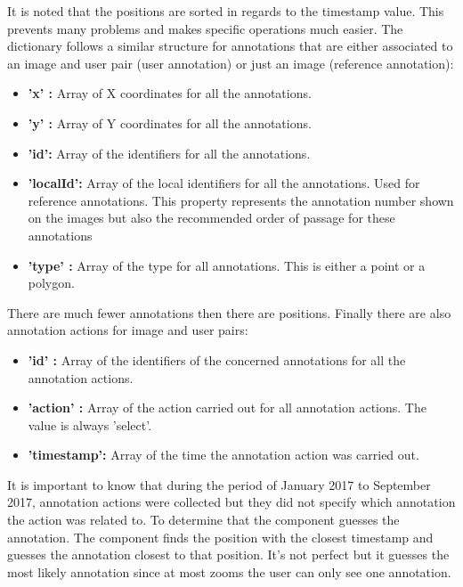 \documentclass[a4paper,11pt]{report}
\numberwithin{figure}{section} %
\begin{document}
    It is noted that the positions are sorted in regards to the timestamp value.
    This prevents many problems and makes specific operations much easier.
    The dictionary follows a similar structure for annotations that are either associated to an image and user pair (user annotation) or just an image (reference annotation):
    \begin{itemize}
        \item[\textbullet] \textbf{'x' :} Array of X coordinates for all the annotations.
        \item[\textbullet] \textbf{'y' :} Array of Y coordinates for all the annotations.
        \item[\textbullet] \textbf{'id':} Array of the identifiers for all the annotations.
        \item[\textbullet] \textbf{'localId':} Array of the local identifiers for all the annotations.
        Used for reference annotations.
        This property represents the annotation number shown on the images but also the recommended order of passage for these annotations
        \item[\textbullet] \textbf{'type' :} Array of the type for all annotations.
        This is either a point or a polygon.
    \end{itemize}

    There are much fewer annotations then there are positions.
    Finally there are also annotation actions for image and user pairs:
    \begin{itemize}
        \item[\textbullet] \textbf{'id' :} Array of the identifiers of the concerned annotations for all the annotation actions.
        \item[\textbullet] \textbf{'action' :} Array of the action carried out for all annotation actions.
        The value is always 'select'.
        \item[\textbullet] \textbf{'timestamp':} Array of the time the annotation action was carried out.
    \end{itemize}
    It is important to know that during the period of January 2017 to September 2017, annotation actions were collected but they did not specify which annotation the action was related to.
    To determine that the component guesses the annotation.
    The component finds the position with the closest timestamp and guesses the annotation closest to that position.
    It's not perfect but it guesses the most likely annotation since at most zooms the user can only see one annotation.\\
\end{document}
